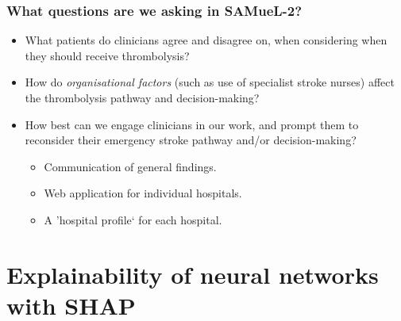 \documentclass[xcolor={usenames,dvipsnames}]{beamer}
\newcommand{\smallurl}[1]{\textcolor{blue}{\fontsize{4pt}{4.8pt}\selectfont \url{#1}}}
\begin{document}
\begin{frame}
\frametitle{What questions are we asking in SAMueL-2?}
\begin{itemize}
    \setlength\itemsep{5mm}
    \item What patients do clinicians agree and disagree on, when considering when they should receive thrombolysis?
    \item How do \emph{organisational factors} (such as use of specialist stroke nurses) affect the thrombolysis pathway and decision-making?
    \item How best can we engage clinicians in our work, and prompt them to reconsider their emergency stroke pathway and/or decision-making?
    
    \begin{itemize}
        \item Communication of general findings.
        \item Web application for individual hospitals.
        \item A 'hospital profile` for each hospital.
    \end{itemize}
\end{itemize}

\end{frame}


\section{Explainability of neural networks with SHAP}





\end{document}
